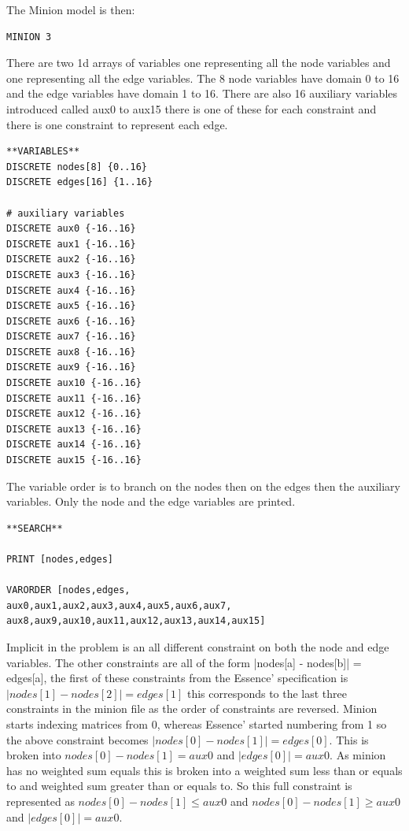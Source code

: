 \documentclass[oneside]{book}
\begin{document}
The Minion model is then:

\begin{verbatim}
MINION 3
\end{verbatim}

There are two 1d arrays of variables one representing all the node variables and one representing all the edge variables. The 8 node variables have domain 0 to 16 and the edge variables have domain 1 to 16. There are also 16 auxiliary variables introduced called aux0 to aux15 there is one of these for each constraint and there is one constraint to represent each edge. 

\begin{verbatim}
**VARIABLES**
DISCRETE nodes[8] {0..16}
DISCRETE edges[16] {1..16}

# auxiliary variables
DISCRETE aux0 {-16..16}
DISCRETE aux1 {-16..16}
DISCRETE aux2 {-16..16}
DISCRETE aux3 {-16..16}
DISCRETE aux4 {-16..16}
DISCRETE aux5 {-16..16}
DISCRETE aux6 {-16..16}
DISCRETE aux7 {-16..16}
DISCRETE aux8 {-16..16}
DISCRETE aux9 {-16..16}
DISCRETE aux10 {-16..16}
DISCRETE aux11 {-16..16}
DISCRETE aux12 {-16..16}
DISCRETE aux13 {-16..16}
DISCRETE aux14 {-16..16}
DISCRETE aux15 {-16..16}
\end{verbatim}

The variable order is to branch on the nodes then on the edges then the auxiliary variables. Only the node and the edge variables are printed. 

\begin{verbatim}
**SEARCH**

PRINT [nodes,edges]

VARORDER [nodes,edges,
aux0,aux1,aux2,aux3,aux4,aux5,aux6,aux7,
aux8,aux9,aux10,aux11,aux12,aux13,aux14,aux15]
\end{verbatim}

Implicit in the problem is an all different constraint on both the node and edge variables. The other constraints are all of the form |nodes[a] - nodes[b]| = edges[a], the first of these constraints from the Essence' specification is $|nodes[1] - nodes[2]| = edges[1]$  this corresponds to the last three constraints in the minion file as the order of constraints are reversed. Minion starts indexing matrices from 0, whereas Essence' started numbering from 1 so the above constraint becomes $|nodes[0] - nodes[1]| = edges[0]$.  This is broken into $nodes[0] - nodes[1] = aux0$ and $|edges[0]| = aux0$. As minion has no weighted sum equals this is broken into a weighted sum less than or equals to and weighted sum greater than or equals to. So this full constraint is represented as $nodes[0] - nodes[1]  \leq aux0$ and $nodes[0] - nodes[1]  \geq aux0$ and $|edges[0]| = aux0$. 
\end{document}
